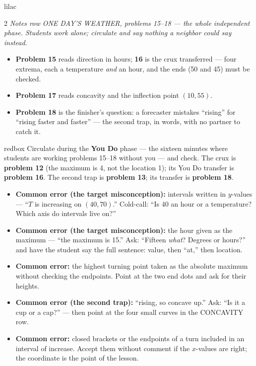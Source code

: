 \documentclass[10pt]{article}
\begin{document}
\begin{skillbox}{lilac}
\begin{multicols}{2}
\textit{Notes row ONE DAY'S WEATHER, problems 15--18 --- the whole independent phase. Students
work alone; circulate and say nothing a neighbor could say instead.}
\begin{itemize}
  \item \textbf{Problem 15} reads direction in hours; \textbf{16} is the crux transferred ---
        four extrema, each a temperature \emph{and} an hour, and the ends (50 and 45) must be
        checked.
  \item \textbf{Problem 17} reads concavity and the inflection point $(10, 55)$.
  \item \textbf{Problem 18} is the finisher's question: a forecaster mistakes ``rising'' for
        ``rising faster and faster'' --- the second trap, in words, with no partner to catch it.
\end{itemize}
\end{multicols}
\end{skillbox}

\begin{skillbox}{redbox}
Circulate during the \textbf{You Do} phase --- the sixteen minutes where students are working
problems 15--18 without you --- and check. The crux is \textbf{problem 12} (the maximum is 4,
not the location 1); its You Do transfer is \textbf{problem 16}. The second trap is
\textbf{problem 13}; its transfer is \textbf{problem 18}.
\begin{itemize}
  \item \textbf{Common error (the target misconception):} intervals written in $y$-values ---
        ``$T$ is increasing on $(40, 70)$.'' Cold-call: ``Is 40 an hour or a temperature?
        Which axis do intervals live on?''
  \item \textbf{Common error (the target misconception):} the hour given as the maximum ---
        ``the maximum is 15.'' Ask: ``Fifteen \emph{what}? Degrees or hours?'' and have the
        student say the full sentence: value, then ``at,'' then location.
  \item \textbf{Common error:} the highest turning point taken as the absolute maximum without
        checking the endpoints. Point at the two end dots and ask for their heights.
  \item \textbf{Common error (the second trap):} ``rising, so concave up.'' Ask: ``Is it a cup
        or a cap?'' --- then point at the four small curves in the CONCAVITY row.
  \item \textbf{Common error:} closed brackets or the endpoints of a turn included in an
        interval of increase. Accept them without comment if the $x$-values are right; the
        coordinate is the point of the lesson.
\end{itemize}
\end{skillbox}
\end{document}
